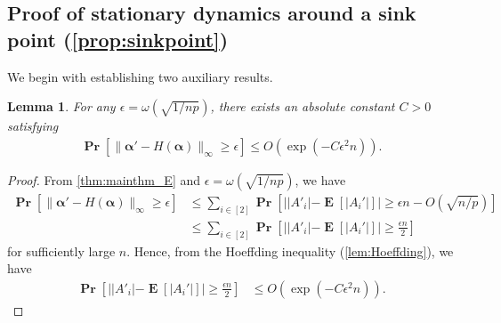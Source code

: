 \documentclass[letterpaper,11pt]{article}
\newtheorem{lemma}[theorem]{Lemma}
\renewcommand\Pr{\mathop{\mathbf{Pr}}}
\DeclareMathOperator{\E}{\mathbf{E}}
\begin{document}
\subsection[dynamics at sink points]{Proof of stationary dynamics around a sink point (\cref{prop:sinkpoint})} \label{sec:sinkpoint_proof}
We begin with establishing two auxiliary results.
\begin{lemma} \label{lem:constantfar}
For any $\epsilon = \omega(\sqrt{1/np})$, there exists an absolute constant $C>0$ satisfying
\begin{align*}
\Pr\left[\|{\boldsymbol \alpha'}-H({\boldsymbol \alpha})\|_\infty \geq\epsilon\right]\leq O(\exp(-C \epsilon^2 n)).
\end{align*}
\end{lemma}
%
\begin{proof}
From \cref{thm:mainthm_E} and $\epsilon = \omega(\sqrt{1/np})$, we have
\begin{align*}
\Pr\left[\|{\boldsymbol \alpha'}-H({\boldsymbol \alpha})\|_\infty\geq\epsilon\right]
&\leq \sum_{i\in[2]}\Pr\left[||A'_i|-\E[|A_i'|]|\geq \epsilon n-O(\sqrt{n/p})\right]\\
&\leq \sum_{i\in[2]}\Pr\left[||A'_i|-\E[|A_i'|]|\geq \frac{\epsilon n}{2}\right]
\end{align*}
for sufficiently large $n$.
Hence, from the Hoeffding inequality (\cref{lem:Hoeffding}), we have
\begin{align*}
\Pr\left[||A'_i|-\E[|A_i'|]|\geq \frac{\epsilon n}{2}\right]
&\leq O\left(\exp\left(-C\epsilon^2 n\right)\right).
\end{align*}
\end{proof}
\end{document}
